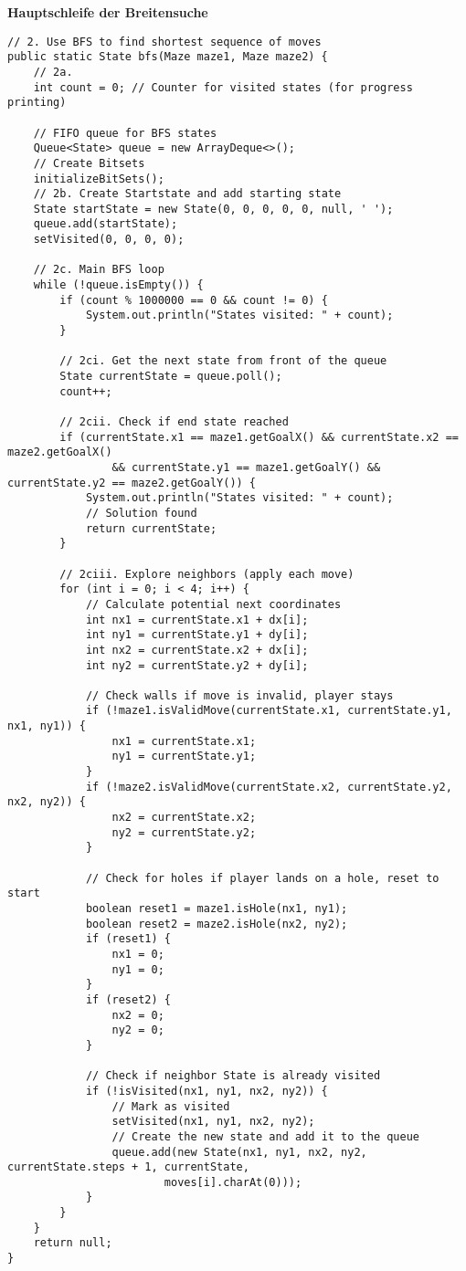 \documentclass[a4paper,10pt,ngerman]{scrartcl}
\begin{document}
\textbf{Hauptschleife der Breitensuche}
\begin{lstlisting}
// 2. Use BFS to find shortest sequence of moves
public static State bfs(Maze maze1, Maze maze2) {
    // 2a.
    int count = 0; // Counter for visited states (for progress printing)

    // FIFO queue for BFS states
    Queue<State> queue = new ArrayDeque<>();
    // Create Bitsets
    initializeBitSets();
    // 2b. Create Startstate and add starting state
    State startState = new State(0, 0, 0, 0, 0, null, ' ');
    queue.add(startState);
    setVisited(0, 0, 0, 0);

    // 2c. Main BFS loop
    while (!queue.isEmpty()) {
        if (count % 1000000 == 0 && count != 0) {
            System.out.println("States visited: " + count);
        }

        // 2ci. Get the next state from front of the queue
        State currentState = queue.poll();
        count++;

        // 2cii. Check if end state reached
        if (currentState.x1 == maze1.getGoalX() && currentState.x2 == maze2.getGoalX()
                && currentState.y1 == maze1.getGoalY() && currentState.y2 == maze2.getGoalY()) {
            System.out.println("States visited: " + count);
            // Solution found
            return currentState;
        }

        // 2ciii. Explore neighbors (apply each move)
        for (int i = 0; i < 4; i++) {
            // Calculate potential next coordinates
            int nx1 = currentState.x1 + dx[i];
            int ny1 = currentState.y1 + dy[i];
            int nx2 = currentState.x2 + dx[i];
            int ny2 = currentState.y2 + dy[i];

            // Check walls if move is invalid, player stays
            if (!maze1.isValidMove(currentState.x1, currentState.y1, nx1, ny1)) {
                nx1 = currentState.x1;
                ny1 = currentState.y1;
            }
            if (!maze2.isValidMove(currentState.x2, currentState.y2, nx2, ny2)) {
                nx2 = currentState.x2;
                ny2 = currentState.y2;
            }

            // Check for holes if player lands on a hole, reset to start
            boolean reset1 = maze1.isHole(nx1, ny1);
            boolean reset2 = maze2.isHole(nx2, ny2);
            if (reset1) {
                nx1 = 0;
                ny1 = 0;
            }
            if (reset2) {
                nx2 = 0;
                ny2 = 0;
            }

            // Check if neighbor State is already visited
            if (!isVisited(nx1, ny1, nx2, ny2)) {
                // Mark as visited
                setVisited(nx1, ny1, nx2, ny2);
                // Create the new state and add it to the queue
                queue.add(new State(nx1, ny1, nx2, ny2, currentState.steps + 1, currentState,
                        moves[i].charAt(0)));
            }
        }
    }
    return null;
}
\end{lstlisting}
\end{document}
